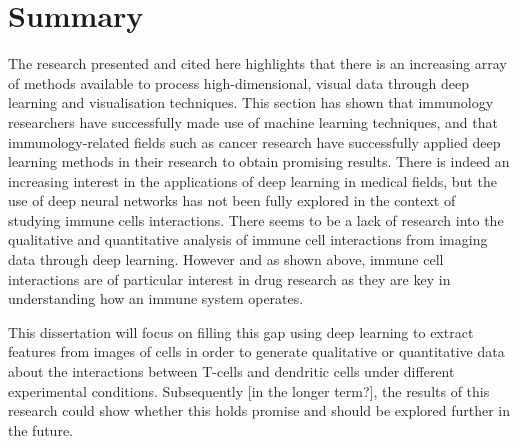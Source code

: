 \section{Summary}

The research presented and cited here highlights that there is an increasing array of methods available to process high-dimensional, visual data through deep learning and visualisation techniques. This section has shown that immunology researchers have successfully made use of machine learning techniques, and that immunology-related fields such as cancer research have successfully applied deep learning methods in their research to obtain promising results. There is indeed an increasing interest in the applications of deep learning in medical fields, but the use of deep neural networks has not been fully explored in the context of studying immune cells interactions. There seems to be a lack of research into the qualitative and quantitative analysis of immune cell interactions from imaging data through deep learning. However and as shown above, immune cell interactions are of particular interest in drug research as they are key in understanding how an immune system operates.

This dissertation will focus on filling this gap using deep learning to extract features from images of cells in order to generate qualitative or quantitative data about the interactions between T-cells and dendritic cells under different experimental conditions. Subsequently [in the longer term?], the results of this research could show whether this holds promise and should be explored further in the future.
